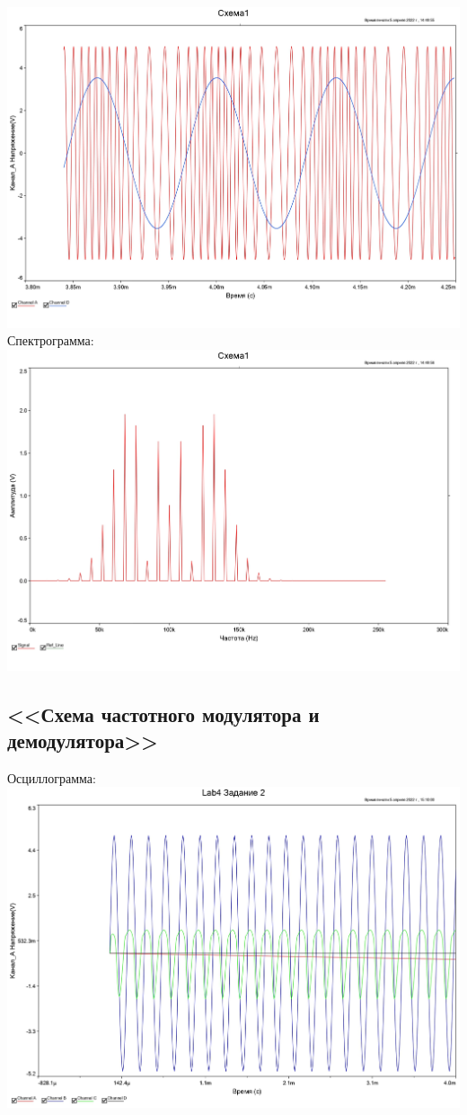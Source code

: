 \documentclass[11pt]{article}
\begin{document}
\begin{itemize}
\includegraphics[width=1\linewidth]{img/1/key_closed/osc.jpg}
Спектрограмма:\\
\includegraphics[width=1\linewidth]{img/1/key_closed/specter.jpg}
\end{itemize}
\subsection{<<Схема частотного модулятора и демодулятора>>}
Осциллограмма:\\
\includegraphics[width=1\linewidth]{img/2/osc2.jpg}
\end{document}
